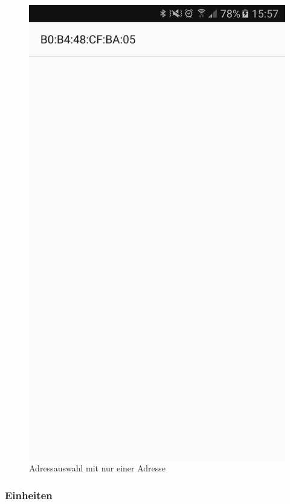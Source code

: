 \begin{figure}[ht]
    \includegraphics{3Vorgehen/imag/BLEAdresseAuswaehlen.png}
    \caption{Adressauswahl mit nur einer Adresse}
	\label{BLEadressauswahl} 
\end{figure}

\subsubsection{Einheiten}

